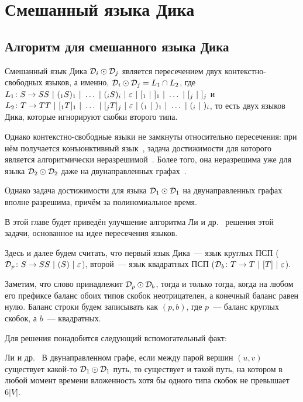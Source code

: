 \section{Смешанный языка Дика}\label{section:dyck_1_1}

\subsection{Алгоритм для смешанного языка Дика}

Смешанный язык Дика $\mathcal{D}_i \odot \mathcal{D}_j$ является пересечением двух контекстно-свободных языков, а именно, 
$\mathcal{D}_i \odot \mathcal{D}_j = L_1 \cap L_2$, где 
$L_1 \colon S \rightarrow S S~|~(_1 S )_1~|~ \dots ~|~(_i S )_i ~|~ \varepsilon ~|~ [_1 ~|~ ]_1 ~|~ \dots ~|~ [_j ~|~ ]_j$ и 
$L_2 \colon T \rightarrow T T~|~[_1 T ]_1~|~ \dots ~|~[_j T ]_j ~|~ \varepsilon ~|~ (_1 ~|~ )_1 ~|~ \dots ~|~ (_i ~|~ )_i$, 
то есть двух языков Дика, которые игнорируют скобки второго типа. 

Однако контекстно-свободные языки не замкнуты относительно пересечения: при нём получается конъюнктивный язык~\cite{Okhotin01}, задача достижимости для которого является алгоритмически неразрешимой~\cite{Hellings14}. Более того, она неразрешима уже для языка $\mathcal{D}_2 \odot \mathcal{D}_2$ даже на двунаправленных графах~\cite{Li21}. 

Однако задача достижимости для языка $\mathcal{D}_1 \odot \mathcal{D}_1$ на двунаправленных графах вполне разрешима, причём за полиномиальное время.

В этой главе будет приведён улучшение алгоритма Ли и др.~\cite{Li21} решения этой задачи, основанное на идее пересечения языков.

\begin{note}\label{fact:intersection}

  Здесь и далее будем считать, что первый язык Дика~--- язык круглых ПСП ($\mathcal{D}_p \colon S \rightarrow SS~|~(S)~|~\varepsilon$), второй~--- язык квадратных ПСП ($\mathcal{D}_b \colon T \rightarrow T~|~[T]~|~\varepsilon$).
\end{note}

Заметим, что слово принадлежит $\mathcal{D}_p \odot \mathcal{D}_b$, тогда и только тогда, когда на любом его префиксе баланс обоих типов скобок неотрицателен, а конечный баланс равен нулю. Баланс строки будем записывать как $(p, b)$, где $p$~--- баланс круглых скобок, а $b$~--- квадратных.

Для решения понадобится следующий вспомогательный факт:

\begin{lemma}{Ли и др.~\cite{Li21}}\label{lm:dyck_6v}
  В двунаправленном графе, если между парой вершин $(u, v)$ существует какой-то $\mathcal{D}_1 \odot \mathcal{D}_1$ путь, то существует и такой путь, на котором в любой момент времени вложенность хотя бы одного типа скобок не превышает $6 |V|$.
\end{lemma}

